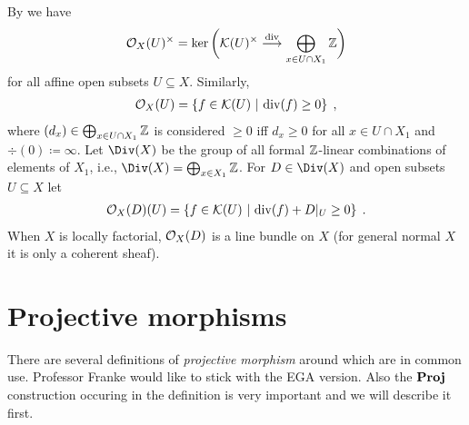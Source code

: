 \documentclass[a4paper,parskip=half,numbers=enddot, DIV=12]{scrreprt}
\begin{document}
By  we have
\begin{align*}
	\Oo_X(U)^\times =\ker\bigg(\Kk(U)^\times\morphism[\div]\bigoplus_{x\in U\cap X_1}\IZ\bigg)
\end{align*}
for all affine open subsets $U\subseteq X$. Similarly,
\begin{align*}
	\mathcal{O}_X(U)=\left\{f\in\mathcal{K}(U)\ \middle|\  \operatorname{div}(f)\geq 0\right\}\;,
\end{align*}
where $(d_x)\in \bigoplus_{x\in U\cap X_1}\mathbb{Z}$ is considered $\geq 0$ iff $d_x\geq 0$ for all $x\in U\cap X_1$ and $\div(0)\coloneqq\infty$. Let $\Div(X)$ be the group of all formal $\mathbb{Z}$-linear combinations of elements of $X_1$, i.e., $\Div(X)=\bigoplus_{x\in X_1}\IZ$. For $D\in\Div(X)$ and open subsets $U\subseteq X$ let
\begin{align*}
	\mathcal{O}_X(D)(U)=\left\{f\in\mathcal{K}(U)\ \middle|\ \operatorname{div}(f)+D|_U\geq 0\right\}\;.
\end{align*}
When $X$ is locally factorial, $\mathcal{O}_X(D)$ is a line bundle on $X$ (for general normal $X$ it is only a coherent sheaf).

\section{Projective morphisms}
There are several definitions of \emph{projective morphism} around which are in common use. Professor Franke would like to stick with the EGA version. Also the $\operatorname{\mathbf{Proj}}$ construction occuring in the definition is very important and we will describe it first.
\end{document}
